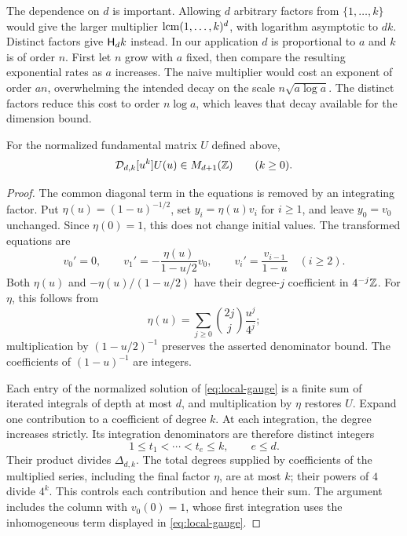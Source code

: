 The dependence on $d$ is important. Allowing $d$ arbitrary factors from
$\{1,\ldots,k\}$ would give the larger multiplier
$\operatorname{lcm}(1,\ldots,k)^d$, with logarithm asymptotic to $dk$.
Distinct factors give $\mathsf H_d k$ instead. In our application $d$ is
proportional to $a$ and $k$ is of order $n$. First let $n$ grow with
$a$ fixed, then compare the resulting exponential rates as $a$ increases.
The naive multiplier would cost an exponent of order $an$, overwhelming
the intended decay on the scale $n\sqrt{a\log a}$. The distinct factors
reduce this cost to order $n\log a$, which leaves that decay available
for the dimension bound.

\begin{lemma}\label{lem:denominators}
For the normalized fundamental matrix $U$ defined above,
\[
 \mathcal D_{d,k}[u^k]U(u)\in M_{d+1}(\mathbb Z)
 \qquad(k\geq0).
\]
\end{lemma}

\begin{proof}
The common diagonal term in the equations is removed by an integrating
factor. Put $\eta(u)=(1-u)^{-1/2}$, set $y_i=\eta(u)v_i$ for $i\geq1$,
and leave $y_0=v_0$ unchanged. Since $\eta(0)=1$, this does not change
initial values.
The transformed equations are
\begin{equation}\label{eq:local-gauge}
 v_0'=0,\qquad
 v_1'=-\frac{\eta(u)}{1-u/2}v_0,\qquad
 v_i'=\frac{v_{i-1}}{1-u}\quad(i\geq2).
\end{equation}
Both $\eta(u)$ and $-\eta(u)/(1-u/2)$ have their degree-$j$ coefficient
in $4^{-j}\mathbb Z$. For $\eta$, this follows from
\[
 \eta(u)=\sum_{j\geq0}\binom{2j}{j}\frac{u^j}{4^j};
\]
multiplication by $(1-u/2)^{-1}$ preserves the asserted denominator bound.
The coefficients of $(1-u)^{-1}$ are integers.

Each entry of the normalized solution of \eqref{eq:local-gauge} is a
finite sum of iterated integrals of depth at most $d$, and multiplication
by $\eta$ restores $U$. Expand one contribution to a coefficient of degree
$k$. At each integration, the degree increases strictly. Its integration
denominators are therefore distinct integers
\[
 1\leq t_1<\cdots<t_e\leq k,\qquad e\leq d.
\]
Their product divides $\Delta_{d,k}$.
The total degrees supplied by coefficients of the multiplied series,
including the final factor $\eta$, are at most $k$; their powers of $4$
divide $4^k$. This controls each contribution and hence their sum.
The argument includes the column with $v_0(0)=1$, whose first integration
uses the inhomogeneous term displayed in \eqref{eq:local-gauge}.
\end{proof}

